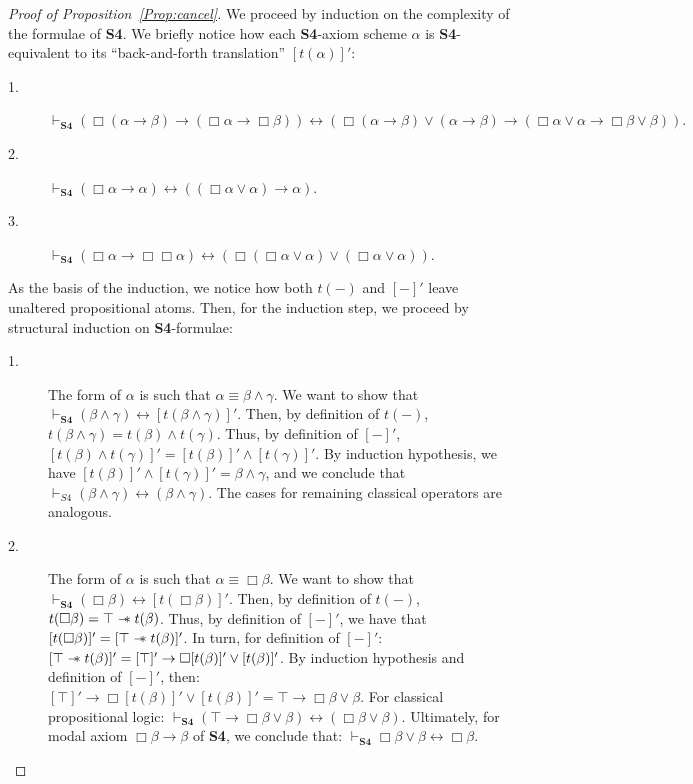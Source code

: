 \documentclass[a4paper]{article}
\newcommand\magicwand{\mathrel{-\mkern-6mu*}}
\newcommand{\SFour}{\textbf{S4}\xspace}
\newcommand{\rev}[1]{[#1]'}
\begin{document}
\begin{proof}[Proof of Proposition~\ref{Prop:cancel}] We proceed by induction on the complexity of the formulae of \SFour. We briefly notice how each \SFour-axiom scheme $\alpha$ is \SFour-equivalent to its ``back-and-forth translation'' $\rev{t(\alpha)}$:

    \begin{description}
        \item[1.] $\vdash_{\SFour} (\Box(\alpha \rightarrow \beta) \rightarrow (\Box \alpha \rightarrow \Box \beta)) \leftrightarrow (\Box(\alpha \rightarrow \beta)\lor (\alpha \rightarrow \beta) \rightarrow (\Box \alpha \lor \alpha \rightarrow \Box \beta \lor \beta)).$ 
        \item[2.] $\vdash_{\SFour} (\Box \alpha \rightarrow \alpha) \leftrightarrow ((\Box \alpha \lor \alpha) \rightarrow \alpha).$   
        \item[3.] $\vdash_{\SFour}(\Box \alpha \rightarrow \Box \Box \alpha)\leftrightarrow (\Box(\Box \alpha\lor \alpha)\lor (\Box \alpha \lor \alpha)).$ 
        
    \end{description}
    
    As the basis of the induction, we notice how both $t(-)$ and $\rev{-}$ leave unaltered propositional atoms. Then, for the induction step, we proceed by structural induction on \SFour-formulae:

    \begin{description}
        
      

        \item[1.] The form of $\alpha$ is such that $\alpha \equiv \beta \land \gamma$. We want to show that $\vdash_{\SFour}(\beta\land\gamma) \leftrightarrow [t(\beta\land\gamma)]'$. Then, by definition of $t(-)$, $t(\beta \land \gamma)=t(\beta)\land t(\gamma)$. Thus, by definition of $\rev{-}$, $[t(\beta)\land t(\gamma)]'=[t(\beta)]'\land[t(\gamma)]'$. By induction hypothesis, we have $[t(\beta)]'\land[t(\gamma)]'=\beta \land \gamma$, and we conclude that $\vdash_{S4}(\beta \land \gamma) \leftrightarrow (\beta \land \gamma)$. The cases for remaining classical operators are analogous.
        
        \item[2.] The form of $\alpha$ is such that $\alpha \equiv \Box \beta$. We want to show that $\vdash_{\SFour}(\Box\beta) \leftrightarrow [t(\Box\beta)]'$. Then, by definition of $t(-)$, $t(\Box \beta)= \top \magicwand t(\beta)$. Thus, by definition of $\rev{-}$, we have that $[t(\Box \beta)]'= [\top \magicwand t(\beta)]'$. In turn, for definition of $\rev{-}$: $[\top \magicwand t(\beta)]' = [\top]'\rightarrow \Box [t(\beta)]'\lor [t(\beta)]'$. By induction hypothesis and definition of $\rev{-}$, then: $[\top]'\rightarrow \Box [t(\beta)]'\lor [t(\beta)]'=\top \rightarrow \Box \beta \lor \beta$. For classical propositional logic: $\vdash_{\SFour}(\top \rightarrow \Box \beta \lor \beta) \leftrightarrow (\Box \beta \lor \beta)$. Ultimately, for modal axiom $\Box \beta \rightarrow \beta$ of \SFour, we conclude that: $\vdash_{\SFour}\Box \beta \lor \beta \leftrightarrow \Box \beta$.
        

\end{description}
\end{proof}
\end{document}
